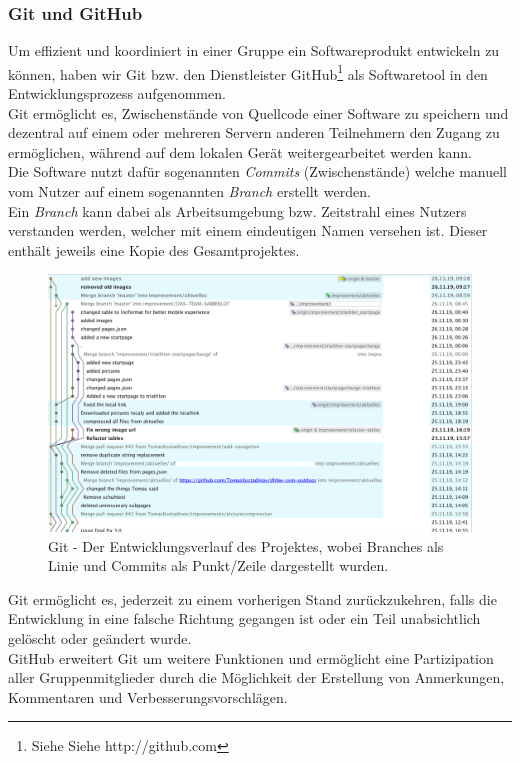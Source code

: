 \documentclass[12pt,a4paper]{article}
\begin{document}
\subsubsection{Git und GitHub}
Um effizient und koordiniert in einer Gruppe ein Softwareprodukt entwickeln zu können, haben wir Git bzw. den Dienstleister GitHub\footnote{\label{foot:2}Siehe Siehe http://github.com} als Softwaretool in den Entwicklungsprozess aufgenommen.\\
Git ermöglicht es, Zwischenstände von Quellcode einer Software zu speichern und dezentral auf einem oder mehreren Servern anderen Teilnehmern den Zugang zu ermöglichen, während auf dem lokalen Gerät weitergearbeitet werden kann.\\
Die Software nutzt dafür sogenannten \textit{Commits} (Zwischenstände) welche manuell vom Nutzer auf einem sogenannten \textit{Branch} erstellt werden. \\
Ein \textit{Branch} kann dabei als Arbeitsumgebung bzw. Zeitstrahl eines Nutzers verstanden werden, welcher mit einem eindeutigen Namen versehen ist. Dieser enthält jeweils eine Kopie des Gesamtprojektes.
\begin{figure}[!htbp]
	\includegraphics[scale=0.4]{git.png}
	\caption{Git - Der Entwicklungsverlauf des Projektes, wobei Branches als Linie und Commits als Punkt/Zeile dargestellt wurden.}
	\label{img:git}
\end{figure}
Git ermöglicht es, jederzeit zu einem vorherigen Stand zurückzukehren, falls die Entwicklung in eine falsche Richtung gegangen ist oder ein Teil unabsichtlich gelöscht oder geändert wurde.\\
GitHub erweitert Git um weitere Funktionen und ermöglicht eine Partizipation aller Gruppenmitglieder durch die Möglichkeit der Erstellung von Anmerkungen, Kommentaren und Verbesserungsvorschlägen. 
\end{document}
